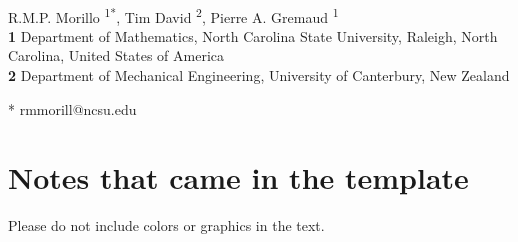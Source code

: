 \documentclass[10pt,letterpaper]{article}
\begin{document}
	\vspace*{0.2in}
	\begin{flushleft}
		{\Large
			\textbf{} 
		}
		\newline
		\\
		R.M.P. Morillo \textsuperscript{1*},
		Tim David \textsuperscript{2},
		Pierre A. Gremaud \textsuperscript{1}
		\\
		\bigskip
		\textbf{1} Department of Mathematics, North Carolina State University, Raleigh, North Carolina, United States of America
		\\
		\textbf{2} Department of Mechanical Engineering, University of Canterbury, New Zealand
		\\
		\bigskip
		
		
		
		
		
		
		* rmmorill@ncsu.edu
		
	\end{flushleft}
	
	\listoftodos
	
	\section*{\textinterrobang Notes that came in the template}
	Please do not include colors or graphics in the text.
	
\end{document}
